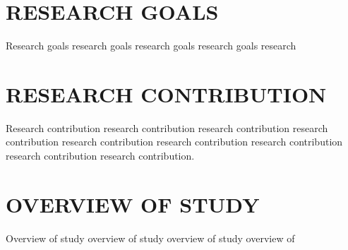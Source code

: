 \section{RESEARCH GOALS}

Research goals research goals research goals research goals research

\section{RESEARCH CONTRIBUTION}

Research contribution research contribution research contribution
research contribution research contribution research contribution
research contribution research contribution research contribution.

\section{OVERVIEW OF STUDY}

Overview of study overview of study overview of study overview of

